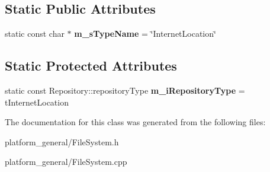 \subsection*{\-Static \-Public \-Attributes}
\begin{DoxyCompactItemize}
\item 
\hypertarget{classgeneral__server_1_1InternetLocation_adfca4cbe80b3d7e7fe4be46fbe9f1e70}{static const char $\ast$ {\bfseries m\-\_\-s\-Type\-Name} = \char`\"{}\-Internet\-Location\char`\"{}}\label{classgeneral__server_1_1InternetLocation_adfca4cbe80b3d7e7fe4be46fbe9f1e70}

\end{DoxyCompactItemize}
\subsection*{\-Static \-Protected \-Attributes}
\begin{DoxyCompactItemize}
\item 
\hypertarget{classgeneral__server_1_1InternetLocation_af6eeaca1eb6f26bdb0b38b03c668ce72}{static const \*
\-Repository\-::repository\-Type {\bfseries m\-\_\-i\-Repository\-Type} = t\-Internet\-Location}\label{classgeneral__server_1_1InternetLocation_af6eeaca1eb6f26bdb0b38b03c668ce72}

\end{DoxyCompactItemize}


\-The documentation for this class was generated from the following files\-:\begin{DoxyCompactItemize}
\item 
platform\-\_\-general/\-File\-System.\-h\item 
platform\-\_\-general/\-File\-System.\-cpp\end{DoxyCompactItemize}
